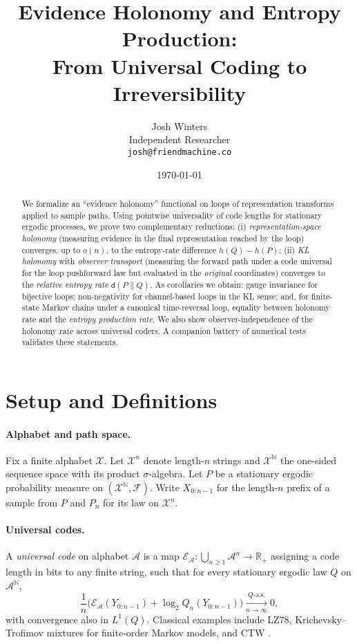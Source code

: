 \documentclass[11pt]{article}
\title{Evidence Holonomy and Entropy Production:\\
From Universal Coding to Irreversibility}
\author{Josh Winters\\Independent Researcher\\\texttt{josh@friendmachine.co}}
\date{\today}
\newcommand{\X}{\mathcal{X}}
\newcommand{\N}{\mathbb{N}}
\newcommand{\1}{\mathbbm{1}}
\newcommand{\code}{\mathcal{E}}
\newcommand{\RR}{\mathbb{R}}
\begin{document}
\maketitle

\begin{abstract}
We formalize an ``evidence holonomy'' functional on loops of representation transforms applied to sample paths. Using pointwise universality of code lengths for stationary ergodic processes, we prove two complementary reductions:
(i) \emph{representation-space holonomy} (measuring evidence in the final representation reached by the loop) converges, up to $o(n)$, to the entropy-rate difference $h(Q)-h(P)$; (ii) \emph{KL holonomy} with \emph{observer transport} (measuring the forward path under a code universal for the loop pushforward law but evaluated in the \emph{original} coordinates) converges to the \emph{relative entropy rate} $\mathsf{d}(P\|Q)$. As corollaries we obtain: gauge invariance for bijective loops; non-negativity for channel-based loops in the KL sense; and, for finite-state Markov chains under a canonical time-reversal loop, equality between holonomy rate and the \emph{entropy production rate}. We also show observer-independence of the holonomy rate across universal coders. A companion battery of numerical tests validates these statements.
\end{abstract}

\section{Setup and Definitions}

\paragraph{Alphabet and path space.} Fix a finite alphabet $\X$. Let $\X^n$ denote length-$n$ strings and $\X^{\N}$ the one-sided sequence space with its product $\sigma$-algebra. Let $P$ be a stationary ergodic probability measure on $(\X^{\N},\mathcal{F})$. Write $X_{0:n-1}$ for the length-$n$ prefix of a sample from $P$ and $P_n$ for its law on $\X^n$.

\paragraph{Universal codes.}
A \emph{universal code} on alphabet $\mathcal{A}$ is a map $\code_{\mathcal{A}}:\bigcup_{n\ge 1}\mathcal{A}^n\to \RR_+$ assigning a code length in bits to any finite string, such that for every stationary ergodic law $Q$ on $\mathcal{A}^{\N}$,
\begin{equation}\label{eq:universality}
\frac{1}{n}\Big(\code_{\mathcal{A}}(Y_{0:n-1}) + \log_2 Q_n(Y_{0:n-1})\Big) \xrightarrow[n\to\infty]{Q\text{-a.s.}} 0,
\end{equation}
with convergence also in $L^1(Q)$. Classical examples include LZ78, Krichevsky--Trofimov mixtures for finite-order Markov models, and CTW \cite{ziv1978,kt1981,willems1995ctw,shields1996,csiszarshields2004}.
\end{document}
